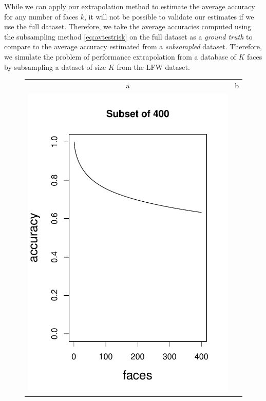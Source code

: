 \documentclass[12pt]{article}
\begin{document}
While we can apply our extrapolation method to estimate the average
accuracy for any number of faces $k$, it will not be possible to
validate our estimates if we use the full dataset.  Therefore, we take
the average accuracies computed using the subsampling method
\eqref{eq:avtestrisk} on the full dataset as a \emph{ground truth} to
compare to the average accuracy estimated from a \emph{subsampled}
dataset.  Therefore, we simulate the problem of performance
extrapolation from a database of $K$ faces by subsampling a
dataset of size $K$ from the LFW dataset.

\begin{figure}
\centering
\begin{tabular}{cc}
a & b\\
\includegraphics[scale = 0.5]{acc_plot1.pdf} &

\end{tabular}
\end{figure}
\end{document}
